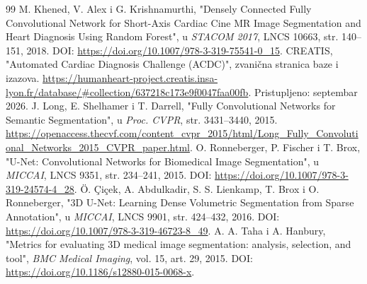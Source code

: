 \documentclass[11pt,a4paper]{article}
\begin{document}
\begin{thebibliography}{99}
	 M. Khened, V. Alex i G. Krishnamurthi, "Densely Connected Fully Convolutional Network for Short-Axis Cardiac Cine MR Image Segmentation and Heart Diagnosis Using Random Forest", u \textit{STACOM 2017}, LNCS 10663, str. 140--151, 2018. DOI: \url{https://doi.org/10.1007/978-3-319-75541-0_15}.
	 CREATIS, "Automated Cardiac Diagnosis Challenge (ACDC)", zvanična stranica baze i izazova. \url{https://humanheart-project.creatis.insa-lyon.fr/database/#collection/637218c173e9f0047faa00fb}. Pristupljeno: septembar 2026.
	 J. Long, E. Shelhamer i T. Darrell, "Fully Convolutional Networks for Semantic Segmentation", u \textit{Proc. CVPR}, str. 3431--3440, 2015. \url{https://openaccess.thecvf.com/content_cvpr_2015/html/Long_Fully_Convolutional_Networks_2015_CVPR_paper.html}.
	 O. Ronneberger, P. Fischer i T. Brox, "U-Net: Convolutional Networks for Biomedical Image Segmentation", u \textit{MICCAI}, LNCS 9351, str. 234--241, 2015. DOI: \url{https://doi.org/10.1007/978-3-319-24574-4_28}.
	 Ö. Çiçek, A. Abdulkadir, S. S. Lienkamp, T. Brox i O. Ronneberger, "3D U-Net: Learning Dense Volumetric Segmentation from Sparse Annotation", u \textit{MICCAI}, LNCS 9901, str. 424--432, 2016. DOI: \url{https://doi.org/10.1007/978-3-319-46723-8_49}.
	 A. A. Taha i A. Hanbury, "Metrics for evaluating 3D medical image segmentation: analysis, selection, and tool", \textit{BMC Medical Imaging}, vol. 15, art. 29, 2015. DOI: \url{https://doi.org/10.1186/s12880-015-0068-x}.
\end{thebibliography}
\end{document}
